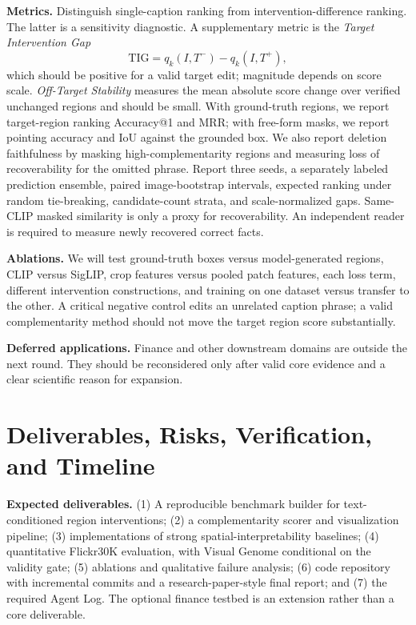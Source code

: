 \documentclass[10pt,twocolumn]{article}
\begin{document}
\textbf{Metrics.} Distinguish single-caption ranking from intervention-difference ranking. The latter is a sensitivity diagnostic. A supplementary metric is the \emph{Target Intervention Gap}
\begin{equation}
\mathrm{TIG}=q_k(I,T^{-})-q_k(I,T^{+}),
\end{equation}
which should be positive for a valid target edit; magnitude depends on score scale. \emph{Off-Target Stability} measures the mean absolute score change over verified unchanged regions and should be small. With ground-truth regions, we report target-region ranking Accuracy@1 and MRR; with free-form masks, we report pointing accuracy and IoU against the grounded box. We also report deletion faithfulness by masking high-complementarity regions and measuring loss of recoverability for the omitted phrase. Report three seeds, a separately labeled prediction ensemble, paired image-bootstrap intervals, expected ranking under random tie-breaking, candidate-count strata, and scale-normalized gaps. Same-CLIP masked similarity is only a proxy for recoverability. An independent reader is required to measure newly recovered correct facts.

\textbf{Ablations.} We will test ground-truth boxes versus model-generated regions, CLIP versus SigLIP, crop features versus pooled patch features, each loss term, different intervention constructions, and training on one dataset versus transfer to the other. A critical negative control edits an unrelated caption phrase; a valid complementarity method should not move the target region score substantially.

\textbf{Deferred applications.} Finance and other downstream domains are outside the next round. They should be reconsidered only after valid core evidence and a clear scientific reason for expansion.

\section{Deliverables, Risks, Verification, and Timeline}
\textbf{Expected deliverables.} (1) A reproducible benchmark builder for text-conditioned region interventions; (2) a complementarity scorer and visualization pipeline; (3) implementations of strong spatial-interpretability baselines; (4) quantitative Flickr30K evaluation, with Visual Genome conditional on the validity gate; (5) ablations and qualitative failure analysis; (6) code repository with incremental commits and a research-paper-style final report; and (7) the required Agent Log. The optional finance testbed is an extension rather than a core deliverable.
\end{document}
